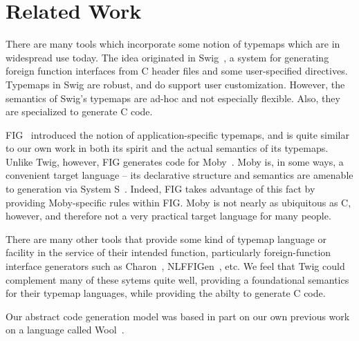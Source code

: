 
\section{Related Work}

There are many tools which incorporate some notion of typemaps which are in widespread use today. The idea originated in Swig~\cite{swig}, a system for generating foreign function interfaces from C header files and some user-specified directives. Typemaps in Swig are robust, and do support user customization. However, the semantics of Swig's typemaps are ad-hoc and not especially flexible. Also, they are specialized to generate C code.

FIG~\cite{fig} introduced the notion of application-specific typemaps, and is quite similar to our own work in both its spirit and the actual semantics of its typemaps. Unlike Twig, however, FIG generates code for Moby~\cite{moby-classes}. Moby is, in some ways, a convenient target language -- its declarative structure and semantics are amenable to generation via System S~\cite{fisher00interop}. Indeed, FIG takes advantage of this fact by providing Moby-specific rules within FIG. Moby is not nearly as ubiquitous as C, however, and therefore not a very practical target language for many people.

There are many other tools that provide some kind of typemap language or facility in the service of their intended function, particularly foreign-function interface generators such as Charon~\cite{moby-interop-framework}, NLFFIGen~\cite{blume01}, etc. We feel that Twig could complement many of these sytems quite well, providing a foundational semantics for their typemap languages, while providing the abilty to generate C code.

Our abstract code generation model was based in part on our own previous work on a language called Wool~\cite{wool}.
